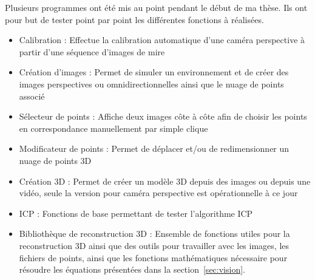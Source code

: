 Plusieurs programmes ont été mis au point pendant le début de ma thèse.
Ils ont pour but de tester point par point les différentes fonctions à réalisées.
\begin{itemize}
\item Calibration : Effectue la calibration automatique d'une caméra perspective à partir d'une séquence d'images de mire
\item Création d'images :  Permet de simuler un environnement et de créer des images perspectives ou omnidirectionnelles ainsi que le nuage de points associé
\item Sélecteur de points : Affiche deux images côte à côte afin de choisir les points en correspondance manuellement par simple clique
\item Modificateur de points : Permet de déplacer et/ou de redimensionner un nuage de points 3D
\item Création 3D : Permet de créer un modèle 3D depuis des images ou depuis une vidéo, seule la version pour caméra perspective est opérationnelle à ce jour
\item ICP : Fonctions de base permettant de tester l'algorithme ICP
\item Bibliothèque de reconstruction 3D : Ensemble de fonctions utiles pour la reconstruction 3D ainsi que des outils pour travailler avec les images, les fichiers de points, ainsi que les fonctions mathématiques nécessaire pour résoudre les équations présentées dans la section~\ref{sec:vision}.
\end{itemize}

